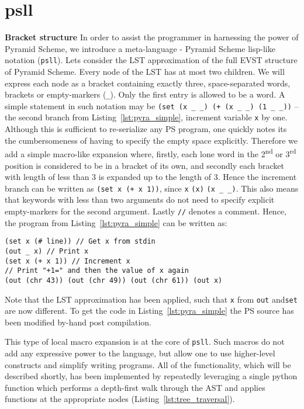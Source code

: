 \documentclass[aip,jcp,reprint,footinbib]{revtex4-1}
\let\tt\texttt
\newcommand\psll{\texttt{psll}\xspace}
\newcommand{\ilpsll}[1]{\lstinline[language=psll,columns=flexible]{#1}}
\begin{document}
\section{psll}

\textbf{Bracket structure} In order to assist the programmer in harnessing the power of Pyramid Scheme, we introduce a meta-language - Pyramid Scheme lisp-like notation (\psll). Lets consider the LST approximation of the full EVST structure of Pyramid Scheme. Every node of the LST has at most two children. We will express each node as a bracket containing exactly three, space-separated words, brackets or empty-markers (\ilpsll{_}). Only the first entry is allowed to be a word. A simple statement in such notation may be \ilpsll{(set (x _ _) (+ (x _ _) (1 _ _))} -- the second branch from Listing~\ref{lst:pyra_simple}, increment variable \tt{x} by one. Although this is sufficient to re-serialize any PS program, one quickly notes its the cumbersomeness of having to specify the empty space explicitly. Therefore we add a simple macro-like expansion where, firstly, each lone word in the 2\textsuperscript{nd} or 3\textsuperscript{rd} position is considered to be in a bracket of its own, and secondly each bracket with length of less than 3 is expanded up to the length of 3. Hence the increment branch can be written as \ilpsll{(set x (+ x 1))}, since \ilpsll{x} \textrightarrow \ilpsll{(x)} \textrightarrow \ilpsll{(x _ _)}. This also means that keywords with less than two arguments do not need to specify explicit empty-markers for the second argument. Lastly \tt{//} denotes a comment. Hence, the program from Listing~\ref{lst:pyra_simple} can be written as:
\begin{lstlisting}[language=psll,
    label=lst:psll_simple, caption={
    LST approximation of the program from Listing~\ref{lst:pyra_simple} in simple \psll notation.
}]
(set x (# line)) // Get x from stdin
(out _ x) // Print x
(set x (+ x 1)) // Increment x
// Print "+1=" and then the value of x again
(out (chr 43)) (out (chr 49)) (out (chr 61)) (out x)
\end{lstlisting}
Note that the LST approximation has been applied, such that \tt{x} from \tt{out} and\tt{set} are now different. To get the code in Listing~\ref{lst:pyra_simple} the PS source has been modified by-hand post compilation.

This type of local macro expansion is at the core of \psll. Such macros do not add any expressive power to the language,\cite{krishnamurthi2019} but allow one to use higher-level constructs and simplify writing programs. All of the functionality, which will be described shortly, has been implemented by repeatedly leveraging a single python function which performs a depth-first walk through the AST and applies functions at the appropriate nodes (Listing~\ref{lst:tree_traversal}).
\end{document}
